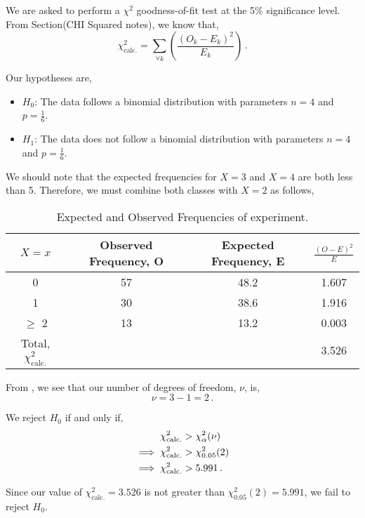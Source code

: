 \begin{subquestions}

\subquestion

We are asked to perform a $\chi^2$ goodness-of-fit test at the 5\% significance level. From Section(CHI Squared notes), we know that,
\begin{equation}
	\chi^2_\text{calc.} = \sum_{\forall k} \left(\frac{(O_k-E_k)^2}{E_k}  \right) \,.
\end{equation}

Our hypotheses are,
\begin{itemize}
	\item $H_0$: The data follows a binomial distribution with parameters $n=4$ and $p=\frac{1}{6}$. 
	\item $H_1$: The data does not follow a binomial distribution with parameters $n=4$ and $p=\frac{1}{6}$.
\end{itemize}

We should note that the expected frequencies for $X=3$ and $X=4$ are both less than 5. Therefore, we must combine both classes with $X=2$ as follows,
\begin{table}[H]
	\centering
	\begin{tabular}{|c|c|c|c|}
		\hline 
		$X=x$ & Observed Frequency, O & Expected Frequency, E & $\frac{(O-E)^2}{E}$ \\
		\hline
		0 & 57 & 48.2 & 1.607 \\
		1 & 30 & 38.6 & 1.916 \\
		$\geq$ 2 & 13 & 13.2 & 0.003 \\
		\hline
		Total, $\chi^2_\text{calc.}$ & & & 3.526 \\
		\hline
	\end{tabular}
	\caption{\label{2008M:q3:ChiTab} Expected and Observed Frequencies of experiment.}
\end{table}

From , we see that our number of degrees of freedom, $\nu$, is,
\begin{equation}
	\nu = 3 - 1 = 2 \,.
\end{equation}

We reject $H_0$ if and only if,
\begin{align}
	\chi^2_\text{calc.} & > \chi^2_{\alpha}(\nu) \nonumber \\
	\implies \chi^2_\text{calc.} & > \chi^2_{0.05}(2) \nonumber \\
	\implies \chi^2_\text{calc.} & > 5.991 \,.
\end{align}

Since our value of $\chi^2_\text{calc.}=3.526$ is not greater than $\chi^2_{0.05}(2)=5.991$, we fail to reject $H_0$.

\end{subquestions}
